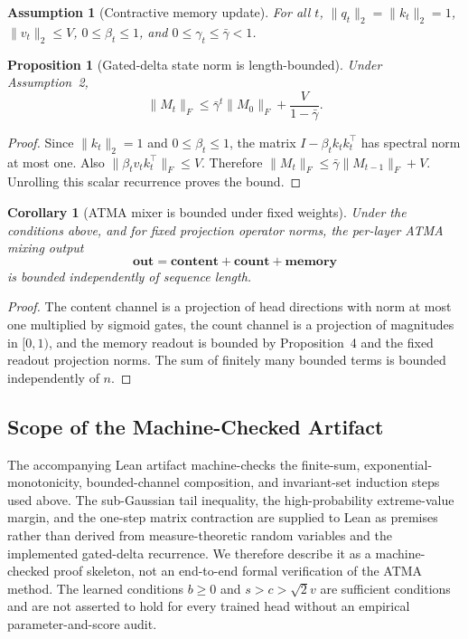 \documentclass{article} %
\newtheorem{assumption}{Assumption}
\newtheorem{proposition}{Proposition}
\newtheorem{corollary}{Corollary}
\begin{document}
\begin{assumption}[Contractive memory update]
For all $t$, $\lVert q_t\rVert_2=\lVert k_t\rVert_2=1$, $\lVert v_t\rVert_2\le V$, $0\le\beta_t\le1$, and
$0\le\gamma_t\le\bar{\gamma}<1$.
\end{assumption}

\begin{proposition}[Gated-delta state norm is length-bounded]
Under Assumption~2,
\begin{equation}
    \lVert M_t\rVert_F
    \le
    \bar{\gamma}^t\lVert M_0\rVert_F + \frac{V}{1-\bar{\gamma}} .
\end{equation}
\end{proposition}

\begin{proof}
Since $\lVert k_t\rVert_2=1$ and $0\le\beta_t\le1$, the matrix
$I-\beta_t k_tk_t^\top$ has spectral norm at most one. Also
$\lVert \beta_t v_tk_t^\top\rVert_F \le V$. Therefore
$\lVert M_t\rVert_F\le \bar{\gamma}\lVert M_{t-1}\rVert_F+V$. Unrolling this scalar
recurrence proves the bound.
\end{proof}

\begin{corollary}[ATMA mixer is bounded under fixed weights]
Under the conditions above, and for fixed projection operator norms, the per-layer ATMA
mixing output
\begin{equation}
    \mathbf{out}=\mathbf{content}+\mathbf{count}+\mathbf{memory}
\end{equation}
is bounded independently of sequence length.
\end{corollary}

\begin{proof}
The content channel is a projection of head directions with norm at most one multiplied by
sigmoid gates,
the count channel is a projection of magnitudes in $[0,1)$, and the memory readout is bounded
by Proposition~4 and the fixed readout projection norms. The sum of finitely many bounded
terms is bounded independently of $n$.
\end{proof}

\subsection{Scope of the Machine-Checked Artifact}

The accompanying Lean artifact machine-checks the finite-sum, exponential-monotonicity,
bounded-channel composition, and invariant-set induction steps used above. The sub-Gaussian
tail inequality, the high-probability extreme-value margin, and the one-step matrix contraction
are supplied to Lean as premises rather than derived from measure-theoretic random variables
and the implemented gated-delta recurrence. We therefore describe it as a machine-checked
proof skeleton, not an end-to-end formal verification of the ATMA method. The learned
conditions $b\ge0$ and $s>c>\sqrt{2}v$ are sufficient conditions and are not asserted to hold
for every trained head without an empirical parameter-and-score audit.
\end{document}
